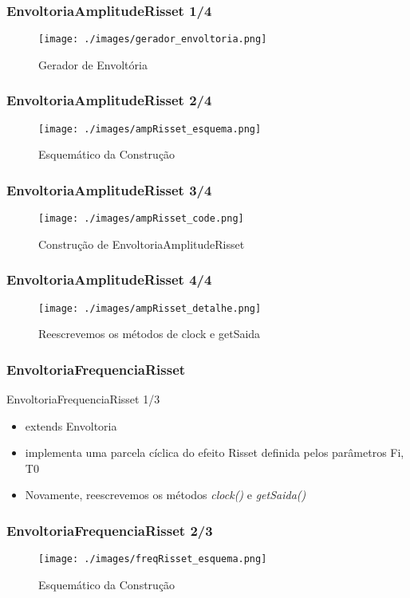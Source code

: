 \documentclass{beamer}
\begin{document}
\begin{frame}
 \frametitle{EnvoltoriaAmplitudeRisset 1/4}
 \begin{figure}
  \texttt{[image: ./images/gerador\_envoltoria.png]}
  \caption{Gerador de Envoltória}
   \end{figure}
\end{frame}

\begin{frame}
 \frametitle{EnvoltoriaAmplitudeRisset 2/4}
 \begin{figure}
  \texttt{[image: ./images/ampRisset\_esquema.png]}
  \caption{Esquemático da Construção}
   \end{figure}
\end{frame}

\begin{frame}
 \frametitle{EnvoltoriaAmplitudeRisset 3/4}
 \begin{figure}
  \texttt{[image: ./images/ampRisset\_code.png]}
  \caption{Construção de EnvoltoriaAmplitudeRisset}
   \end{figure}
\end{frame}

\begin{frame}
 \frametitle{EnvoltoriaAmplitudeRisset 4/4}
 \begin{figure}
  \texttt{[image: ./images/ampRisset\_detalhe.png]}
  \caption{Reescrevemos os métodos de clock e getSaida}
   \end{figure}
\end{frame}

\subsubsection{EnvoltoriaFrequenciaRisset}
\begin{frame}{EnvoltoriaFrequenciaRisset 1/3}
\begin{itemize}
	\item extends Envoltoria
	\item implementa uma parcela cíclica do efeito Risset definida pelos parâmetros
	 Fi, T0
	 \item Novamente, reescrevemos os métodos \emph{clock()} e \emph{getSaida()}
\end{itemize}

\end{frame}

\begin{frame}
 \frametitle{EnvoltoriaFrequenciaRisset 2/3}
 \begin{figure}
  \texttt{[image: ./images/freqRisset\_esquema.png]}
  \caption{Esquemático da Construção}
   \end{figure}
\end{frame}
\end{document}
